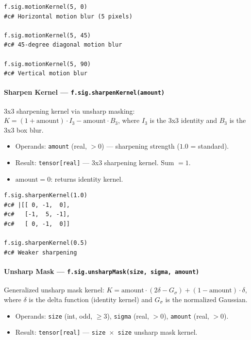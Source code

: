 \begin{verbatim}
f.sig.motionKernel(5, 0)
#c# Horizontal motion blur (5 pixels)

f.sig.motionKernel(5, 45)
#c# 45-degree diagonal motion blur

f.sig.motionKernel(5, 90)
#c# Vertical motion blur
\end{verbatim}

\paragraph{Sharpen Kernel --- \texttt{f.sig.sharpenKernel(amount)}}

3x3 sharpening kernel via unsharp masking: $K = (1+\text{amount}) \cdot I_3 - \text{amount} \cdot B_3$, where $I_3$ is the 3x3 identity and $B_3$ is the 3x3 box blur.

\begin{itemize}
\item Operands: \texttt{amount} (real, $> 0$) --- sharpening strength ($1.0$ = standard).
\item Result: \texttt{tensor[real]} --- 3x3 sharpening kernel. Sum $= 1$.
\item $\text{amount} = 0$: returns identity kernel.
\end{itemize}

\begin{verbatim}
f.sig.sharpenKernel(1.0)
#c# |[[ 0, -1,  0],
#c#   [-1,  5, -1],
#c#   [ 0, -1,  0]]

f.sig.sharpenKernel(0.5)
#c# Weaker sharpening
\end{verbatim}

\paragraph{Unsharp Mask --- \texttt{f.sig.unsharpMask(size, sigma, amount)}}

Generalized unsharp mask kernel: $K = \text{amount} \cdot (2\delta - G_\sigma) + (1 - \text{amount}) \cdot \delta$, where $\delta$ is the delta function (identity kernel) and $G_\sigma$ is the normalized Gaussian.

\begin{itemize}
\item Operands: \texttt{size} (int, odd, $\geq 3$), \texttt{sigma} (real, $> 0$), \texttt{amount} (real, $> 0$).
\item Result: \texttt{tensor[real]} --- \texttt{size $\times$ size} unsharp mask kernel.
\end{itemize}

